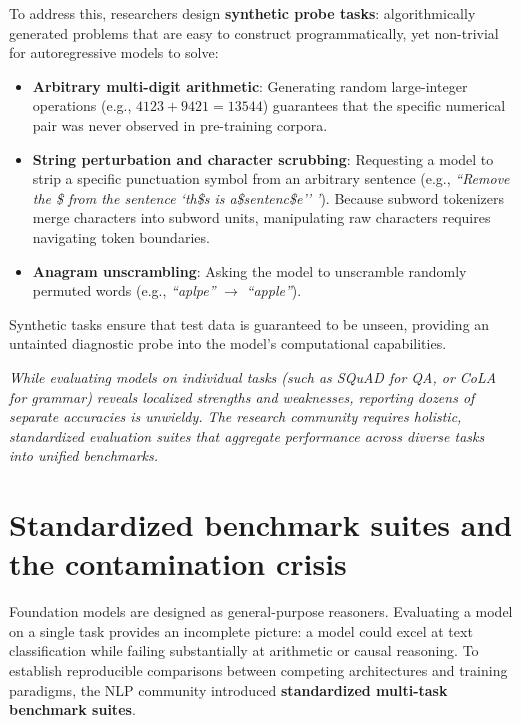 \documentclass[../../main.tex]{subfiles}
\begin{document}
To address this, researchers design \textbf{synthetic probe tasks}: algorithmically generated problems that are easy to construct programmatically, yet non-trivial for autoregressive models to solve:
\begin{itemize}
    \item \textbf{Arbitrary multi-digit arithmetic}: Generating random large-integer operations (e.g., $4123 + 9421 = 13544$) guarantees that the specific numerical pair was never observed in pre-training corpora.
    \item \textbf{String perturbation and character scrubbing}: Requesting a model to strip a specific punctuation symbol from an arbitrary sentence (e.g., \textit{``Remove the \$ from the sentence `th\$s is a\$sentenc\$e'' '}). Because subword tokenizers merge characters into subword units, manipulating raw characters requires navigating token boundaries.
    \item \textbf{Anagram unscrambling}: Asking the model to unscramble randomly permuted words (e.g., \textit{``aplpe''} $\to$ \textit{``apple''}).
\end{itemize}
Synthetic tasks ensure that test data is guaranteed to be unseen, providing an untainted diagnostic probe into the model's computational capabilities.

\textit{While evaluating models on individual tasks (such as SQuAD for QA, or CoLA for grammar) reveals localized strengths and weaknesses, reporting dozens of separate accuracies is unwieldy. The research community requires holistic, standardized evaluation suites that aggregate performance across diverse tasks into unified benchmarks.}

\clearpage

\section{Standardized benchmark suites and the contamination crisis}
\label{sec:benchmarks_contamination}

Foundation models are designed as general-purpose reasoners. Evaluating a model on a single task provides an incomplete picture: a model could excel at text classification while failing substantially at arithmetic or causal reasoning. To establish reproducible comparisons between competing architectures and training paradigms, the NLP community introduced \textbf{standardized multi-task benchmark suites}.
\end{document}
